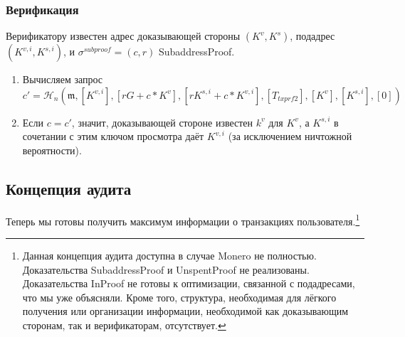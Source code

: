 \subsubsection*{Верификация}

Верификатору известен адрес доказывающей стороны $(K^v, K^s)$, подадрес $(K^{v,i}, K^{s,i})$, \linebreak и $\sigma^{subproof} = (c,r)$ SubaddressProof.

\begin{enumerate}
    \item Вычисляем запрос\vspace{.175cm}
	\[c' = \mathcal{H}_n(\mathfrak{m},[K^{v,i}], [r G + c*K^v], [r K^{s,i} + c*K^{v,i}], [T_{txprf2}], [K^v], [K^{s,i}], [0])\]
    \item Если $c = c'$, значит, доказывающей стороне известен $k^v$ для $K^v$, а $K^{s,i}$ в сочетании с этим ключом просмотра даёт $K^{v,i}$ (за исключением ничтожной вероятности).
\end{enumerate}{}


\subsection{Концепция аудита}
\label{subsec:audit-framework}

Теперь мы готовы получить максимум информации о транзакциях пользователя.\footnote{Данная концепция аудита доступна в случае Monero не полностью. Доказательства SubaddressProof и UnspentProof не реализованы. Доказательства InProof не готовы к оптимизации, связанной с подадресами, что мы уже объясняли. Кроме того, структура, необходимая для лёгкого получения или организации информации, необходимой как доказывающим сторонам, так и верификаторам, отсутствует.}

